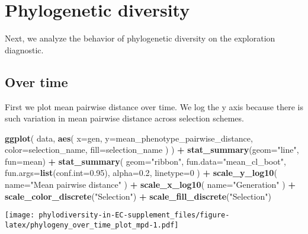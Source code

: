 \documentclass[]{book}
\newenvironment{Shaded}{\begin{snugshade}}{\end{snugshade}}
\newcommand{\DataTypeTok}[1]{\textcolor[rgb]{0.13,0.29,0.53}{#1}}
\newcommand{\DecValTok}[1]{\textcolor[rgb]{0.00,0.00,0.81}{#1}}
\newcommand{\FloatTok}[1]{\textcolor[rgb]{0.00,0.00,0.81}{#1}}
\newcommand{\KeywordTok}[1]{\textcolor[rgb]{0.13,0.29,0.53}{\textbf{#1}}}
\newcommand{\NormalTok}[1]{#1}
\newcommand{\OperatorTok}[1]{\textcolor[rgb]{0.81,0.36,0.00}{\textbf{#1}}}
\newcommand{\StringTok}[1]{\textcolor[rgb]{0.31,0.60,0.02}{#1}}
\begin{document}
\hypertarget{phylogenetic-diversity}{%
\section{Phylogenetic diversity}\label{phylogenetic-diversity}}

Next, we analyze the behavior of phylogenetic diversity on the exploration diagnostic.

\hypertarget{over-time-1}{%
\subsection{Over time}\label{over-time-1}}

First we plot mean pairwise distance over time. We log the y axis because there is such variation in mean pairwise distance across selection schemes.

\begin{Shaded}
\begin{Highlighting}[]
\KeywordTok{ggplot}\NormalTok{(}
\NormalTok{    data,}
    \KeywordTok{aes}\NormalTok{(}
      \DataTypeTok{x=}\NormalTok{gen,}
      \DataTypeTok{y=}\NormalTok{mean_phenotype_pairwise_distance,}
      \DataTypeTok{color=}\NormalTok{selection_name,}
      \DataTypeTok{fill=}\NormalTok{selection_name}
\NormalTok{    )}
\NormalTok{  ) }\OperatorTok{+}
\StringTok{  }\KeywordTok{stat_summary}\NormalTok{(}\DataTypeTok{geom=}\StringTok{"line"}\NormalTok{, }\DataTypeTok{fun=}\NormalTok{mean) }\OperatorTok{+}
\StringTok{  }\KeywordTok{stat_summary}\NormalTok{(}
    \DataTypeTok{geom=}\StringTok{"ribbon"}\NormalTok{,}
    \DataTypeTok{fun.data=}\StringTok{"mean_cl_boot"}\NormalTok{,}
    \DataTypeTok{fun.args=}\KeywordTok{list}\NormalTok{(}\DataTypeTok{conf.int=}\FloatTok{0.95}\NormalTok{),}
    \DataTypeTok{alpha=}\FloatTok{0.2}\NormalTok{,}
    \DataTypeTok{linetype=}\DecValTok{0}
\NormalTok{  ) }\OperatorTok{+}
\StringTok{  }\KeywordTok{scale_y_log10}\NormalTok{(}
    \DataTypeTok{name=}\StringTok{"Mean pairwise distance"}
\NormalTok{  ) }\OperatorTok{+}
\StringTok{  }\KeywordTok{scale_x_log10}\NormalTok{(}
    \DataTypeTok{name=}\StringTok{"Generation"}
\NormalTok{  ) }\OperatorTok{+}
\StringTok{  }\KeywordTok{scale_color_discrete}\NormalTok{(}\StringTok{"Selection"}\NormalTok{) }\OperatorTok{+}
\StringTok{  }\KeywordTok{scale_fill_discrete}\NormalTok{(}\StringTok{"Selection"}\NormalTok{)}
\end{Highlighting}
\end{Shaded}

\texttt{[image: phylodiversity-in-EC-supplement\_files/figure-latex/phylogeny\_over\_time\_plot\_mpd-1.pdf]}
\end{document}
